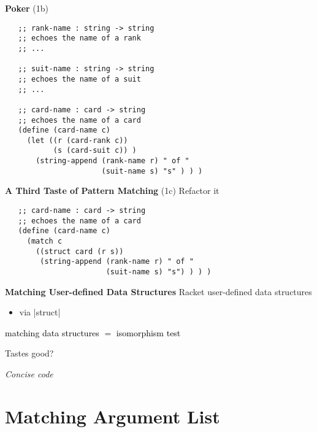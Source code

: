 \documentclass[14pt]{beamer}
\newcommand{\hl}[1]{\textcolor{black}{#1}}
\begin{document}
\begin{frame}[fragile]{{\bf Poker} (1b)}\
 {\footnotesize
  \begin{verbatim}
   ;; rank-name : string -> string
   ;; echoes the name of a rank
   ;; ...

   ;; suit-name : string -> string
   ;; echoes the name of a suit
   ;; ...

   ;; card-name : card -> string
   ;; echoes the name of a card
   (define (card-name c)
     (let ((r (card-rank c))
           (s (card-suit c)) )
       (string-append (rank-name r) " of "
                      (suit-name s) "s" ) ) )
  \end{verbatim}
 }
\end{frame}

\begin{frame}[fragile]{{\bf A Third Taste of Pattern Matching} (1c)}
 Refactor it
 {\footnotesize
  \begin{verbatim}
   ;; card-name : card -> string
   ;; echoes the name of a card
   (define (card-name c)
     (match c
       ((struct card (r s))
        (string-append (rank-name r) " of "
                       (suit-name s) "s") ) ) )
  \end{verbatim}
 }
\end{frame}

\begin{frame}{\bf Matching User-defined Data Structures}
 Racket user-defined data structures
 \begin{itemize}
  \item via |struct|
 \end{itemize}

 \pause

 \hl{matching data structures $=$ isomorphism test}
\end{frame}

\begin{frame}[plain]
 \begin{center}
  {\LARGE
   Tastes good?
   
   \pause

   \em
   Concise code
  }
 \end{center}
\end{frame}

\section{Matching Argument List}
\end{document}
